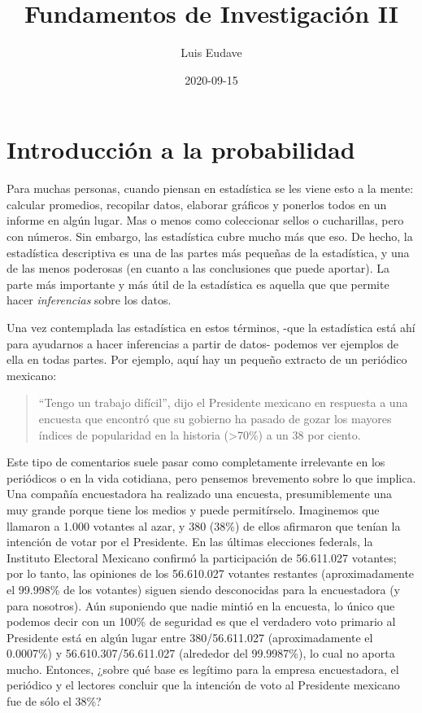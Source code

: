 \documentclass[spanish,]{book}
\title{Fundamentos de Investigación II}
\author{Luis Eudave}
\date{2020-09-15}
\begin{document}
\maketitle

{
\setcounter{tocdepth}{1}
\tableofcontents
}
\chapter{Introducción a la probabilidad}\label{probability}

Para muchas personas, cuando piensan en estadística se les viene esto a
la mente: calcular promedios, recopilar datos, elaborar gráficos y
ponerlos todos en un informe en algún lugar. Mas o menos como
coleccionar sellos o cucharillas, pero con números. Sin embargo, las
estadística cubre mucho más que eso. De hecho, la estadística
descriptiva es una de las partes más pequeñas de la estadística, y una
de las menos poderosas (en cuanto a las conclusiones que puede aportar).
La parte más importante y más útil de la estadística es aquella que que
permite hacer \emph{inferencias} sobre los datos.

Una vez contemplada las estadística en estos términos, -que la
estadística está ahí para ayudarnos a hacer inferencias a partir de
datos- podemos ver ejemplos de ella en todas partes. Por ejemplo, aquí
hay un pequeño extracto de un periódico mexicano:

\begin{quote}
``Tengo un trabajo difícil'', dijo el Presidente mexicano en respuesta a
una encuesta que encontró que su gobierno ha pasado de gozar los mayores
índices de popularidad en la historia (\textgreater{}70\%) a un 38 por
ciento.
\end{quote}

Este tipo de comentarios suele pasar como completamente irrelevante en
los periódicos o en la vida cotidiana, pero pensemos brevemento sobre lo
que implica. Una compañía encuestadora ha realizado una encuesta,
presumiblemente una muy grande porque tiene los medios y puede
permitírselo. Imaginemos que llamaron a 1.000 votantes al azar, y 380
(38\%) de ellos afirmaron que tenían la intención de votar por el
Presidente. En las últimas elecciones federals, la Instituto Electoral
Mexicano confirmó la participación de 56.611.027 votantes; por lo tanto,
las opiniones de los 56.610.027 votantes restantes (aproximadamente el
99.998\% de los votantes) siguen siendo desconocidas para la
encuestadora (y para nosotros). Aún suponiendo que nadie mintió en la
encuesta, lo único que podemos decir con un 100\% de seguridad es que el
verdadero voto primario al Presidente está en algún lugar entre
380/56.611.027 (aproximadamente el 0.0007\%) y 56.610.307/56.611.027
(alrededor del 99.9987\%), lo cual no aporta mucho. Entonces, ¿sobre qué
base es legítimo para la empresa encuestadora, el periódico y el
lectores concluir que la intención de voto al Presidente mexicano fue de
sólo el 38\%?
\end{document}
